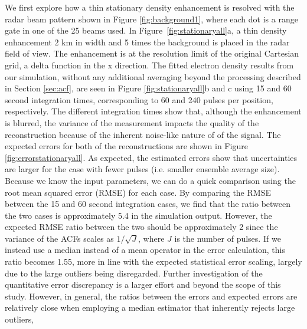 \documentclass[draft,ras]{agutex}
\begin{document}
\begin{article}
We first explore how a thin stationary density enhancement is resolved with the radar beam pattern shown in Figure \ref{fig:background1}, where each dot is a range gate in one of the 25 beams used. In Figure~\ref{fig:stationaryall}a, a thin density enhancement 2 km in width and 5 times the background is placed in the radar field of view. The enhancement is at the resolution limit of the original Cartesian grid, a delta function in the x direction.  The fitted electron density results from our simulation, without any additional averaging beyond the processing described in Section \ref{sec:acf},
are seen in Figure \ref{fig:stationaryall}b and c using 15 and 60 second integration times, corresponding to 60 and 240 pulses per position, respectively. The different integration times show that, although the enhancement is blurred, the variance of the measurement impacts the quality of the reconstruction because of the inherent noise-like nature of of the signal. The expected errors for both of the reconstructions are shown in Figure \ref{fig:errorstationaryall}. As expected, the estimated errors show that uncertainties are larger for the case with fewer pulses (i.e. smaller ensemble average size). 
Because we know the input parameters, we can do a quick comparison using the root mean squared error (RMSE) for each case. By comparing the RMSE between the 15 and 60 second integration cases, we find that the ratio between the two cases is approximately 5.4 in the simulation output.  However, the expected RMSE ratio between the two should be approximately 2 since the variance of the ACFs scales as $1/\sqrt{J}$, where $J$ is the number of pulses. If we instead use a median instead of a mean operator in the error calculation, this ratio becomes 1.55, more in line with the expected statistical error scaling, largely due to the large outliers being disregarded.  Further investigation of the quantitative error discrepancy is a larger effort and beyond the scope of this study.  However, in general, the ratios between the errors and expected errors are relatively close when employing a median estimator that inherently rejects large outliers, 

\end{article}
\end{document}
